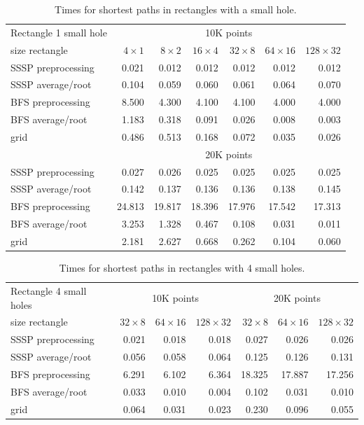 \documentclass[a4paper,USenglish]{lipics}
\begin{document}
\begin{table}
\begin{tabular}{l*{6}{r}}
Rectangle 1 small hole & \multicolumn{6}{c}{10K points}\\						
size rectangle	&	$4\times 1$	&	$8\times 2$	&	$16\times 4$	&	$32\times 8$	&	$64\times 16$	&	$128\times 32$	\\
\hline
SSSP preprocessing	&	0.021	&	0.012	&	0.012	&	0.012	&	0.012	&	0.012	\\
SSSP average/root	&	0.104	&	0.059	&	0.060	&	0.061	&	0.064	&	0.070	\\
BFS preprocessing	&	8.500	&	4.300	&	4.100	&	4.100	&	4.000	&	4.000	\\
BFS average/root	&	1.183	&	0.318	&	0.091	&	0.026	&	0.008	&	0.003	\\
grid	&	0.486	&	0.513	&	0.168	&	0.072	&	0.035	&	0.026\vspace{.2cm}	\\
\hline
  & \multicolumn{6}{c}{20K points}\\						
\hline
SSSP preprocessing	&	0.027	&	0.026	&	0.025	&	0.025	&	0.025	&	0.025	\\
SSSP average/root	&	0.142	&	0.137	&	0.136	&	0.136	&	0.138	&	0.145	\\
BFS preprocessing	&	24.813	&	19.817	&	18.396	&	17.976	&	17.542	&	17.313	\\
BFS average/root	&	3.253	&	1.328	&	0.467	&	0.108	&	0.031	&	0.011	\\
grid				&	2.181	&	2.627	&	0.668	&	0.262	&	0.104	&	0.060	
\end{tabular}
\caption{Times for shortest paths in rectangles with a small hole.}
\label{table2}
\end{table}


\begin{table}
\begin{tabular}{l*{3}{r}|*{3}{r}}
Rectangle 4 small holes & \multicolumn{3}{c|}{10K points} & \multicolumn{3}{c}{20K points}\\
size rectangle	&	$32\times 8$	&	$64\times 16$	&	$128\times 32$	&	$32\times 8$	&	$64\times 16$	&	$128\times 32$\\						
\hline
SSSP preprocessing	&	0.021	&	0.018	&	0.018	&	0.027	&	0.026	&	0.026	\\
SSSP average/root	&	0.056	&	0.058	&	0.064	&	0.125	&	0.126	&	0.131	\\
BFS preprocessing	&	6.291	&	6.102	&	6.364	&	18.325	&	17.887	&	17.256	\\
BFS average/root	&	0.033	&	0.010	&	0.004	&	0.102	&	0.031	&	0.010	\\
grid				&	0.064	&	0.031	&	0.023	&	0.230	&	0.096	&	0.055
\end{tabular}
\caption{Times for shortest paths in rectangles with 4 small holes.}
\label{table4}
\end{table}
\end{document}
